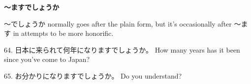 \begin{center}
\textbf{～ますでしょうか } 
\end{center}

\par{ ～でしょうか normally goes after the plain form, but it's occasionally after ～ます in attempts to be more honorific. }

\par{64. 日本に来られて何年になりますでしょうか。 \hfill\break
How many years has it been since you've come to Japan? }

\par{65. お分かりになりますでしょうか。 \hfill\break
Do you understand? }
    